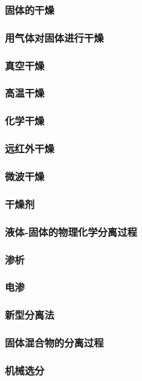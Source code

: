 \documentclass[UTF8]{../../ApplicationUniverse}
\begin{document}
        \subsubsection{固体的干燥}
            \subsubsection{用气体对固体进行干燥}
            \subsubsection{真空干燥}
            \subsubsection{高温干燥}
            \subsubsection{化学干燥}
            \subsubsection{远红外干燥}
            \subsubsection{微波干燥}
            \subsubsection{干燥剂}
    \subsubsection{液体-固体的物理化学分离过程}
        \subsubsection{渗析}
        \subsubsection{电渗}
    \subsubsection{新型分离法}
    \subsubsection{固体混合物的分离过程}
        \subsubsection{机械选分}
\end{document}

